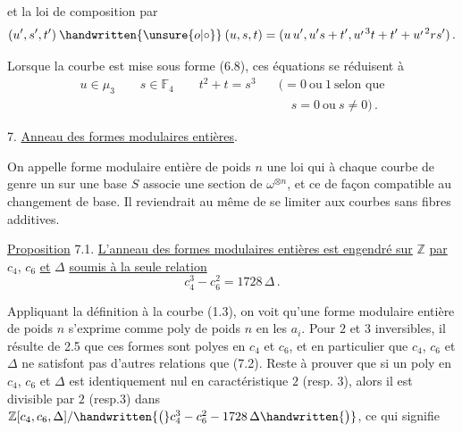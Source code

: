 %
%
et la loi de composition par
\[
(u',s',t')\mathbin{\handwritten{\unsure{o|\circ}}}(u,s,t)
=(u\,u',u's+t',u^{\raisebox{-.38ex}{$\scriptstyle\prime$}\,3}t+t'+u^{\raisebox{-.38ex}{$\scriptstyle\prime$}\,2}rs')\, .
\]

Lorsque la courbe est mise sous forme (6.8), ces équations se réduisent à
\[
\begin{aligned}
u\in\mu_3 \qquad s\in\mathbb{F}_4 \qquad t^2+t=s^3
 &\quad ({}=0\ \text{ou}\ 1\ \text{selon que}\\
 &\qquad s=0\ \text{ou}\ s\ne 0) \, .
\end{aligned}
\]

7. \quad \uline{Anneau des formes modulaires entières}.

On appelle forme modulaire entière de poids $n$ une loi qui à chaque courbe de genre un sur une base $S$ associe une section de $\omega^{\otimes n}$, et ce de façon compatible au changement de base. Il reviendrait au même de se limiter aux courbes sans fibres additives.

\uline{Proposition} 7.1. \quad \uline{L'anneau des formes modulaires entières est engendré sur} $\mathbb{Z}$ \uline{par} $c_4$, $c_6$ \uline{et} $\Delta$ \uline{soumis à la seule relation}
\[
c_4^3-c_6^2=1728\,\Delta \, . \tag*{(7.2.)}
\]

Appliquant la définition à la courbe (1.3), on voit qu'une forme modulaire entière de poids $n$ s'exprime comme poly de poids $n$ en les $a_i$. Pour $2$ et $3$ inversibles, il résulte de 2.5 que ces formes sont  polyes en $c_4$ et $c_6$, et en particulier que $c_4$, $c_6$ et $\Delta$ ne satisfont pas d'autres relations que (7.2). Reste à prouver que si un poly en $c_4$, $c_6$ et $\Delta$ est identiquement nul en caractéristique $2$ (resp. $3$), alors il est divisible par $2$ (resp.$3$) dans $\mathbb{Z}[c_4,c_6,\Delta]/\handwritten{\bigl(}c_4^3-c_6^2-1728\,\Delta\handwritten{\bigr)}$, ce qui signifie%
